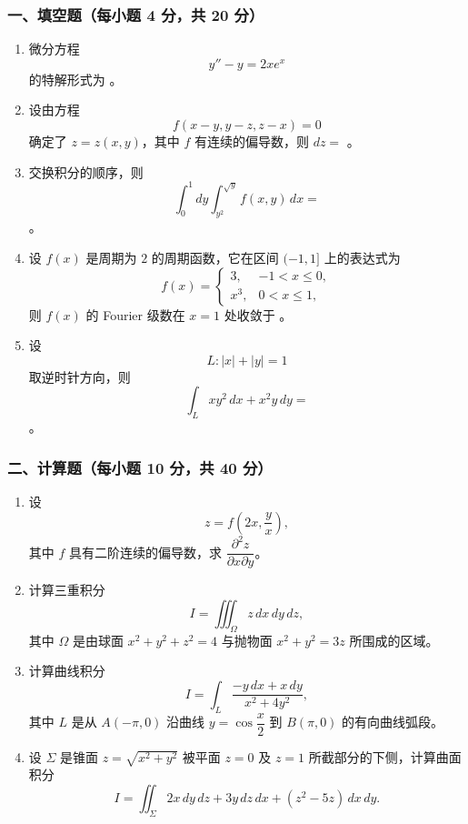 \subsubsection*{一、填空题（每小题 4 分，共 20 分）}
\begin{enumerate}
  \item 微分方程
  \[
  y''-y=2xe^x
  \]
  的特解形式为 \underline{\hspace{4cm}}。
  \item 设由方程
  \[
  f(x-y,y-z,z-x)=0
  \]
  确定了 $z=z(x,y)$，其中 $f$ 有连续的偏导数，则 $dz=$ \underline{\hspace{3cm}}。
  \item 交换积分的顺序，则
  \[
  \int_0^1dy\int_{y^2}^{\sqrt y}f(x,y)\,dx=
  \]
  \underline{\hspace{3cm}}。
  \item 设 $f(x)$ 是周期为 $2$ 的周期函数，它在区间 $(-1,1]$ 上的表达式为
  \[
  f(x)=
  \begin{cases}
  3,&-1<x\le0,\\
  x^3,&0<x\le1,
  \end{cases}
  \]
  则 $f(x)$ 的 Fourier 级数在 $x=1$ 处收敛于 \underline{\hspace{3cm}}。
  \item 设
  \[
  L:|x|+|y|=1
  \]
  取逆时针方向，则
  \[
  \int_L xy^2\,dx+x^2y\,dy=
  \]
  \underline{\hspace{3cm}}。
\end{enumerate}

\subsubsection*{二、计算题（每小题 10 分，共 40 分）}
\begin{enumerate}
  \item 设
  \[
  z=f\!\left(2x,\frac{y}{x}\right),
  \]
  其中 $f$ 具有二阶连续的偏导数，求 $\dfrac{\partial^2z}{\partial x\partial y}$。
  \item 计算三重积分
  \[
  I=\iiint_\Omega z\,dx\,dy\,dz,
  \]
  其中 $\Omega$ 是由球面 $x^2+y^2+z^2=4$ 与抛物面 $x^2+y^2=3z$ 所围成的区域。
  \item 计算曲线积分
  \[
  I=\int_L\frac{-y\,dx+x\,dy}{x^2+4y^2},
  \]
  其中 $L$ 是从 $A(-\pi,0)$ 沿曲线 $y=\cos\dfrac{x}{2}$ 到 $B(\pi,0)$ 的有向曲线弧段。
  \item 设 $\Sigma$ 是锥面 $z=\sqrt{x^2+y^2}$ 被平面 $z=0$ 及 $z=1$ 所截部分的下侧，计算曲面积分
  \[
  I=\iint_\Sigma 2x\,dy\,dz+3y\,dz\,dx+(z^2-5z)\,dx\,dy.
  \]
\end{enumerate}

